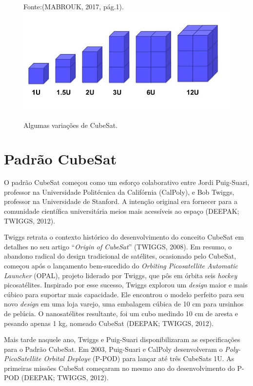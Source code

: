 \begin{figure}[h]
	\centering
    
    Fonte:(MABROUK, 2017, pág.1).
	\includegraphics[keepaspectratio=true,scale=0.58]{figuras/cubesatVariacoes.PNG}
	\caption{Algumas variações de CubeSat.}
	\label{fig04}
\end{figure}

\section{Padrão CubeSat}

O padrão CubeSat começou como um esforço colaborativo entre Jordi Puig-Suari, professor na Universidade Politécnica da Califórnia (CalPoly), e Bob Twiggs, professor na Universidade de Stanford. A intenção original era fornecer para a comunidade científica universitária meios mais acessíveis ao espaço (DEEPAK; TWIGGS, 2012).

Twiggs retrata o contexto histórico do desenvolvimento do conceito CubeSat em detalhes no seu artigo “\textit{Origin of CubeSat}” (TWIGGS, 2008). Em resumo, o abandono radical do design tradicional de satélites, ocasionado pelo CubeSat, começou após o lançamento bem-sucedido do \textit{Orbiting Picosatellite Automatic Launcher} (OPAL), projeto liderado por Twiggs, que pôs em órbita seis \textit{hockey} picosatélites. Inspirado por esse sucesso, Twiggs explorou um \textit{design} maior e mais cúbico para suportar mais capacidade. Ele encontrou o modelo perfeito para seu novo \textit{design} em uma loja varejo, uma embalagem cúbica de 10 cm para ursinhos de pelúcia. O nanosatélites resultante, foi um cubo medindo 10 cm de aresta e pesando apenas 1 kg, nomeado CubeSat (DEEPAK; TWIGGS, 2012).

Mais tarde naquele ano, Twiggs e Puig-Suari disponibilizaram as especificações para o Padrão CubeSat. Em 2003, Puig-Suari e CalPoly desenvolveram o \textit{Poly-PicoSatellite Orbital Deploye} (P-POD) para lançar até três CubeSats 1U. As primeiras missões CubeSat começaram no  mesmo ano do desenvolvimento do P-POD (DEEPAK; TWIGGS, 2012).

